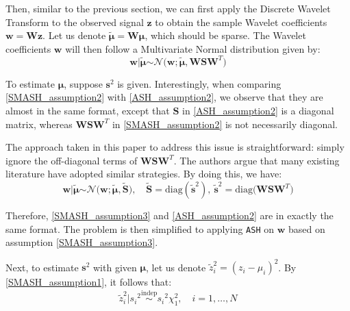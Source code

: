\documentclass[11pt]{article}
\begin{document}
Then, similar to the previous section, we can first apply the Discrete Wavelet Transform to the observed signal $\boldsymbol{z}$ to obtain the sample Wavelet coefficients $\boldsymbol{w} = \boldsymbol{Wz}$. Let us denote $\tilde{\boldsymbol{\mu}} = \boldsymbol{W\mu}$, which should be sparse. The Wavelet coefficients $\boldsymbol{w}$ will then follow a Multivariate Normal distribution given by:
\begin{equation}
\boldsymbol{w} \vert \tilde{\boldsymbol{\mu}} \stackrel{\text{}}{\sim} \mathcal{N} \bigl(\boldsymbol{w}; \tilde{\boldsymbol{\mu}}, \mathbf{W}\mathbf{S}\mathbf{W}^T \bigl) 
\label{SMASH_assumption2}
\end{equation}

To estimate $\boldsymbol{\mu}$, suppose $\boldsymbol{s}^2$ is given. Interestingly, when comparing \eqref{SMASH_assumption2} with \eqref{ASH_assumption2}, we observe that they are almost in the same format, except that $\boldsymbol{S}$ in \eqref{ASH_assumption2} is a diagonal matrix, whereas $\mathbf{W}\mathbf{S}\mathbf{W}^T$ in \eqref{SMASH_assumption2} is not necessarily diagonal.

The approach taken in this paper to address this issue is straightforward: simply ignore the off-diagonal terms of $\mathbf{W}\mathbf{S}\mathbf{W}^T$. The authors argue that many existing literature have adopted similar strategies. By doing this, we have:
\begin{equation}
\boldsymbol{w} \vert \tilde{\boldsymbol{\mu}} \stackrel{\text{}}{\sim} \mathcal{N} \bigl(\boldsymbol{w}; \tilde{\boldsymbol{\mu}}, \tilde{\boldsymbol{S}} \bigl), \quad \tilde{\boldsymbol{S}} = \text{diag} ( \tilde{\boldsymbol{s}}^2 ), \ \tilde{\boldsymbol{s}}^2 = \text{diag} \bigl(\mathbf{W}\mathbf{S}\mathbf{W}^T \bigl)  
\label{SMASH_assumption3}
\end{equation}

Therefore, \eqref{SMASH_assumption3} and \eqref{ASH_assumption2} are in exactly the same format. The problem is then simplified to applying \verb|ASH| on $\boldsymbol{w}$ based on assumption \eqref{SMASH_assumption3}.

Next, to estimate $\boldsymbol{s}^2$ with given $\boldsymbol{\mu}$, let us denote $\tilde{z}_i^2 = (z_i - {\mu}_i)^2 $. By \eqref{SMASH_assumption1}, it follows that:
\begin{equation}
\tilde{z}_i^2 \vert {s_i}^2 \stackrel{\text{indep}}{\sim} {s_i}^2  \chi^2_1, \quad i = 1, \ldots, N 
\label{SMASH_assumption4}
\end{equation}
\end{document}
